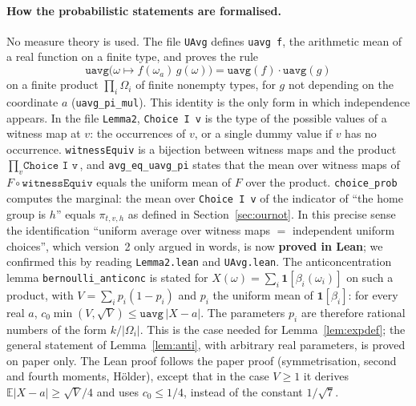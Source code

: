 \documentclass[11pt,a4paper]{article}
\theoremstyle{definition}
\theoremstyle{remark}
\newcommand{\E}{\mathbb{E}}
\begin{document}
\paragraph{How the probabilistic statements are formalised.} No measure theory is used.
The file \texttt{UAvg} defines \texttt{uavg f}, the arithmetic mean of a real function on a
finite type, and proves the rule
\[
\texttt{uavg}\bigl(\omega\mapsto f(\omega_a)\,g(\omega)\bigr)=\texttt{uavg}(f)\cdot\texttt{uavg}(g)
\]
on a finite product $\prod_i\Omega_i$ of finite nonempty types, for $g$ not depending on the
coordinate $a$ (\texttt{uavg\_pi\_mul}). This identity is the only form in which
independence appears. In the file \texttt{Lemma2}, \texttt{Choice I v} is the type of the
possible values of a witness map at $v$: the occurrences of $v$, or a single dummy value if
$v$ has no occurrence. \texttt{witnessEquiv} is a bijection between witness maps and the
product $\prod_v\texttt{Choice I v}$, and \texttt{avg\_eq\_uavg\_pi} states that the mean
over witness maps of $F\circ\texttt{witnessEquiv}$ equals the uniform mean of $F$ over the
product. \texttt{choice\_prob} computes the marginal: the mean over \texttt{Choice I v} of
the indicator of ``the home group is $h$'' equals $\pi_{t,v,h}$ as defined in
Section~\ref{sec:ournot}. In this precise sense the identification ``uniform average over
witness maps $=$ independent uniform choices'', which version~2 only argued in words, is now
\textbf{proved in Lean}; we confirmed this by reading \texttt{Lemma2.lean} and
\texttt{UAvg.lean}. The anticoncentration lemma \texttt{bernoulli\_anticonc} is stated for
$X(\omega)=\sum_i\mathbf 1[\beta_i(\omega_i)]$ on such a product, with
$V=\sum_ip_i(1-p_i)$ and $p_i$ the uniform mean of $\mathbf 1[\beta_i]$: for every real $a$,
$c_0\min(V,\sqrt V)\le\texttt{uavg}\,|X-a|$. The parameters $p_i$ are therefore rational
numbers of the form $k/|\Omega_i|$. This is the case needed for Lemma~\ref{lem:expdef}; the
general statement of Lemma~\ref{lem:anti}, with arbitrary real parameters, is proved on
paper only. The Lean proof follows the paper proof (symmetrisation, second and fourth
moments, H\"older), except that in the case $V\ge1$ it derives $\E|X-a|\ge\sqrt V/4$ and
uses $c_0\le1/4$, instead of the constant $1/\sqrt7$.
\end{document}
